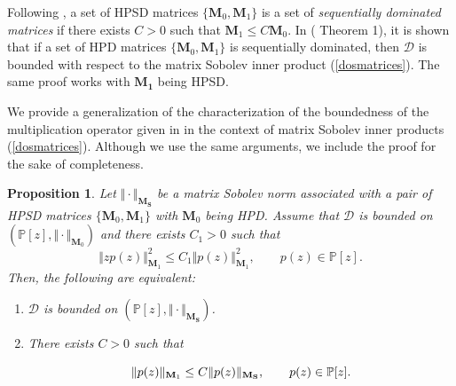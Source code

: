 \documentclass[12pt]{amsart}
\theoremstyle{definition}
\newtheorem{definition}{Definition}
\theoremstyle{plain}
\newtheorem{prop}{Proposition}
\theoremstyle{remark}
\begin{document}
 








\noindent Following \cite{EG23}, a set of HPSD matrices $\{\mathbf{M}_0,\mathbf{M}_1\}$ is a set of {\it sequentially dominated matrices} if there exists $C>0$ such that $\mathbf{M}_1 \leq C \mathbf{M}_0$. In (\cite{EG23} Theorem 1), it is shown that if a set of HPD matrices $\{\mathbf{M}_0,\mathbf{M}_1\}$ is sequentially dominated, then $\mathcal{D}$ is bounded with respect to the matrix Sobolev inner product (\ref{dosmatrices}). The same proof works with $\mathbf{M_1}$ being HPSD.

\bigskip

\noindent We provide a generalization of the characterization of the boundedness of the multiplication operator given in \cite{JR1} in the context of matrix Sobolev inner products (\ref{dosmatrices}). Although we use the same arguments, we include the proof for the sake of completeness.

\begin{prop} Let $\Vert \cdot \Vert_{\mathbf{M_S}}$ be a matrix Sobolev norm associated with a pair of HPSD matrices  $\{\mathbf{M}_0,\mathbf{M}_1\}$  with $\mathbf{M}_0$ being HPD. Assume that $\mathcal{D}$ is bounded on 
$(\mathbb{P}[z],\Vert \cdot \Vert_{\mathbf{M}_0})$ and  there exists $C_1>0$ such that 
$$
\Vert zp(z) \Vert^{2}_{\mathbf{M}_1} \leq C_1 
\Vert p(z) \Vert^2_{\mathbf{M}_1
},\qquad p(z) \in \mathbb{P}[z].
$$
\noindent   Then, the following are equivalent: 
\begin{enumerate} 
\item  $\mathcal{D}$ is bounded on $(\mathbb{P}[z],\Vert \cdot \Vert_{\mathbf{M_S}})$.  

\item There exists  $C>0$ such that

\begin{equation}{\label{condicion}}
\Vert p(z)\Vert_{\mathbf{M}_{1} } \leq C\Vert p(z) \Vert_{\mathbf{M}_{\mathbf{S}}}, \qquad p(z) \in \mathbb{P}[z].
\end{equation}
\end{enumerate}

\end{prop} 
\end{document}
